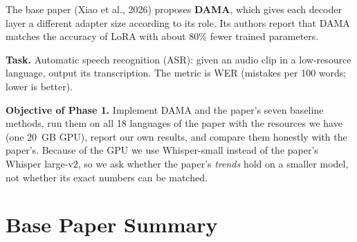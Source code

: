 \documentclass[11pt,a4paper]{article}
\begin{document}
The base paper (Xiao et al., 2026) proposes \textbf{DAMA}, which gives each decoder layer a different adapter size according to its role. Its authors report that DAMA matches the accuracy of LoRA with about 80\% fewer trained parameters.

\textbf{Task.} Automatic speech recognition (ASR): given an audio clip in a low-resource language, output its transcription. The metric is WER (mistakes per 100 words; lower is better).

\textbf{Objective of Phase 1.} Implement DAMA and the paper's seven baseline methods, run them on all 18 languages of the paper with the resources we have (one 20~GB GPU), report our own results, and compare them honestly with the paper's. Because of the GPU we use Whisper-small instead of the paper's Whisper large-v2, so we ask whether the paper's \emph{trends} hold on a smaller model, not whether its exact numbers can be matched.

\section{Base Paper Summary}
\end{document}

